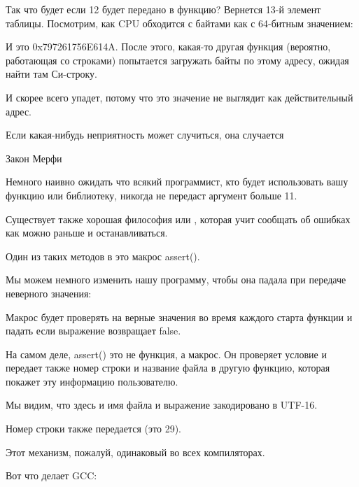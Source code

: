 Так что будет если 12 будет передано в функцию?
Вернется 13-й элемент таблицы.
Посмотрим, как CPU обходится с байтами как с 64-битным значением:



И это 0x797261756E614A.
После этого, какая-то другая функция (вероятно, работающая со строками) попытается загружать байты
по этому адресу, ожидая найти там Си-строку.

И скорее всего упадет, потому что это значение не выглядит как действительный адрес.


\epigraph{Если какая-нибудь неприятность может случиться, она случается}{Закон Мерфи}

Немного наивно ожидать что всякий программист, кто будет использовать вашу функцию или библиотеку,
никогда не передаст аргумент больше 11.

Существует также хорошая философия  или ,
которая учит сообщать об ошибках как можно раньше и останавливаться.

Один из таких методов в \CCpp это макрос assert().

Мы можем немного изменить нашу программу, чтобы она падала при передаче неверного значения:



Макрос будет проверять на верные значения во время каждого старта функции и падать если выражение возвращает false.



На самом деле, assert() это не функция, а макрос. Он проверяет условие и передает также номер строки и название
файла в другую функцию, которая покажет эту информацию пользователю.

Мы видим, что здесь и имя файла и выражение закодировано в UTF-16.

Номер строки также передается (это 29).

Этот механизм, пожалуй, одинаковый во всех компиляторах.

Вот что делает GCC:



